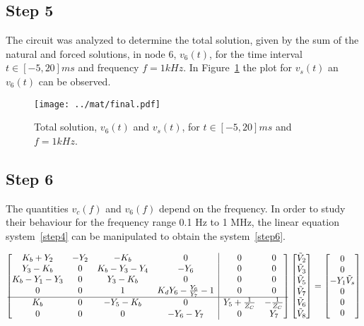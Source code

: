 \subsection{Step 5}
The circuit was analyzed to determine the total solution, given by the sum of the natural and forced solutions, in node 6, $v_6(t)$, for the time interval $t\in [-5,20]ms$ and frequency $f=1kHz$.
In Figure~\ref{fig:v6} the plot for $v_s(t)$ an $v_6(t)$ can be observed.


\begin{figure}[ht!]
  \centering
  \texttt{[image: ../mat/final.pdf]}
  \caption{Total solution, $v_{6}(t)$ and $v_{s}(t)$, for $t\in [-5,20]ms$ and $f=1kHz$.}
  \label{fig:v6}
\end{figure}
\FloatBarrier



\subsection{Step 6}
The quantities $v_c(f)$ and $v_6(f)$ depend on the frequency. In order to study their behaviour for the frequency range 0.1 Hz to 1 MHz, the linear equation system~\ref{step4} can be manipulated to obtain the system~\ref{step6}.

\begin{equation}\label{step6}
  \begin{bmatrix}
    K_b+Y_2 & -Y_2 & -K_b & 0 & \rvline & 0 & 0 \\
    Y_3-K_b & 0 & K_b-Y_3-Y_4 & -Y_6 & \rvline & 0 & 0 \\
    K_b-Y_1-Y_3 & 0 & Y_3-K_b & 0 & \rvline & 0 & 0 \\
    0 & 0 & 1 & K_dY_6-\frac{Y_6}{Y_7}-1 & \rvline & 0 & 0\\
    \hline
    K_b & 0 & -Y_5-K_b & 0 & \rvline & Y_5+\frac{1}{Z_C} & -\frac{1}{Z_C}\\
    0 & 0 & 0 & -Y_6-Y_7 & \rvline & 0 & Y_7\\
  \end{bmatrix}
  \begin{bmatrix}
    \tilde{V}_2\\
    \tilde{V}_3\\
    \tilde{V}_5\\
    \tilde{V}_7\\
    \tilde{V}_6\\
    \tilde{V}_8\\
  \end{bmatrix}
  =
  \begin{bmatrix}
    0\\
    0\\
    -Y_1 \tilde{V}_{s}\\
    0\\
    0\\
    0\\
  \end{bmatrix}
\end{equation}

